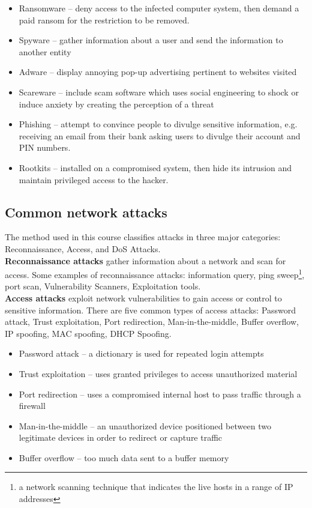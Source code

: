 \begin{itemize}
\item Ransomware -- deny access to the infected computer system, then demand a paid ransom for the restriction to be removed.
\item Spyware -- gather information about a user and send the information to another entity
\item Adware -- display annoying pop-up advertising pertinent to websites visited
\item Scareware -- include scam software which uses social engineering to shock or induce anxiety by creating the perception of a threat
\item Phishing -- attempt to convince people to divulge sensitive information, e.g. receiving an email from their bank asking users to divulge their account and PIN numbers.
\item Rootkits -- installed on a compromised system, then hide its intrusion and maintain privileged access to the hacker.
\end{itemize}

\subsection{Common network attacks}

The method used in this course classifies attacks in three major categories: Reconnaissance, Access, and DoS Attacks.\\

\textbf{Reconnaissance attacks} gather information about a network and scan for access. Some examples of reconnaissance attacks:  information query, ping sweep\footnote{a network scanning technique that indicates the live hosts in a range of IP addresses},  port scan,  Vulnerability Scanners,  Exploitation tools.\\

\textbf{Access attacks} exploit network vulnerabilities to gain access or control to sensitive information. There are five common types of access attacks: Password attack, Trust exploitation, Port redirection, Man-in-the-middle, Buffer overflow, IP spoofing, MAC spoofing, DHCP Spoofing.\\

\begin{itemize}
\item Password attack -- a dictionary is used for repeated login attempts
\item Trust exploitation -- uses granted privileges to access unauthorized material
\item Port redirection -- uses a compromised internal host to pass traffic through a firewall
\item Man-in-the-middle -- an unauthorized device positioned between two legitimate devices in order to redirect or capture traffic
\item Buffer overflow -- too much data sent to a buffer memory
\end{itemize}


